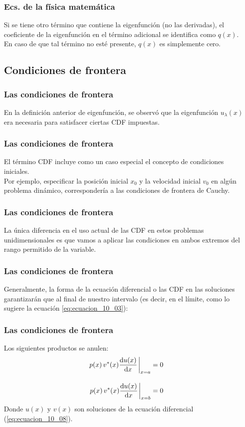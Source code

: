 \documentclass[12pt]{beamer}
\begin{document}
\begin{frame}
\frametitle{Ecs. de la física matemática}
Si se tiene otro término que contiene la eigenfunción (no las derivadas), el coeficiente de la eigenfunción en el término adicional se identifica como $q (x)$.
\\
\bigskip
\pause
En caso de que tal término no esté presente, $q (x)$ es simplemente cero.
\end{frame}

\subsection{Condiciones de frontera}

\begin{frame}
\frametitle{Las condiciones de frontera}
En la definición anterior de eigenfunción, se observó que la eigenfunción $u_{\lambda} (x)$ era necesaria para satisfacer ciertas CDF impuestas. 
\end{frame}
\begin{frame}
\frametitle{Las condiciones de frontera}
El término CDF incluye como un caso especial el concepto de condiciones iniciales.
\\
\bigskip
\pause
Por ejemplo, especificar la posición inicial $x_{0}$ y la velocidad inicial $v_{0}$ en algún problema dinámico, correspondería a las condiciones de frontera de Cauchy.
\end{frame}
\begin{frame}
\frametitle{Las condiciones de frontera}
La única diferencia en el uso actual de las CDF en estos problemas unidimensionales es que vamos a aplicar las condiciones en ambos extremos del rango permitido de la variable.
\end{frame}
\begin{frame}
\frametitle{Las condiciones de frontera}
Generalmente, la forma de la ecuación diferencial o las CDF en las soluciones garantizarán que al final de nuestro intervalo (es decir, en el límite, como lo sugiere la ecuación \ref{eq:ecuacion_10_03}):
\end{frame}
\begin{frame}
\frametitle{Las condiciones de frontera}
Los siguientes productos se anulen:
\pause
\begin{align}
\begin{aligned}
p(x) \, v^{*}(x) \dv{u(x)}{x} \eval_{x = a} = 0 \\[1em]
p(x) \, v^{*}(x) \dv{u(x)}{x} \eval_{x = b} = 0
\label{eq:ecuacion_10_19}
\end{aligned}
\end{align}
Donde $u(x)$ y $v(x)$ son soluciones de la ecuación diferencial (\ref{eq:ecuacion_10_08}).
\end{frame}
\end{document}

